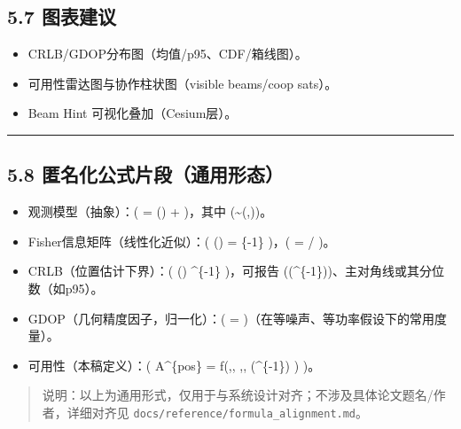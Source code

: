 \subsection{5.7 图表建议}\label{ux56feux8868ux5efaux8bae}

\begin{itemize}
\tightlist
\item
  CRLB/GDOP分布图（均值/p95、CDF/箱线图）。
\item
  可用性雷达图与协作柱状图（visible beams/coop sats）。
\item
  Beam Hint 可视化叠加（Cesium层）。
\end{itemize}

\begin{center}\rule{0.5\linewidth}{0.5pt}\end{center}

\subsection{5.8
匿名化公式片段（通用形态）}\label{ux533fux540dux5316ux516cux5f0fux7247ux6bb5ux901aux7528ux5f62ux6001}

\begin{itemize}
\tightlist
\item
  观测模型（抽象）：(  = () + 
  )，其中 (\sim {}(,))。
\item
  Fisher信息矩阵（线性化近似）：( () =
  \textsuperscript{\top {}}\{-1\} 
  )，( = \partial {} / \partial {} )。
\item
  CRLB（位置估计下界）：( ()
  \succeq {}\^{}\{-1\} )，可报告
  ((\^{}\{-1\}))、主对角线或其分位数（如p95）。
\item
  GDOP（几何精度因子，归一化）：(  =
  )（在等噪声、等功率假设下的常用度量）。
\item
  可用性（本稿定义）：( A\^{}\{pos\} = f\big(,,
  ,,
  \mathbb{1}{[}(\^{}\{-1\}) \le \tau{]}\big)
  \in [0,1] )。
\end{itemize}

\begin{quote}
说明：以上为通用形式，仅用于与系统设计对齐；不涉及具体论文题名/作者，详细对齐见
\texttt{docs/reference/formula\_alignment.md}。
\end{quote}

